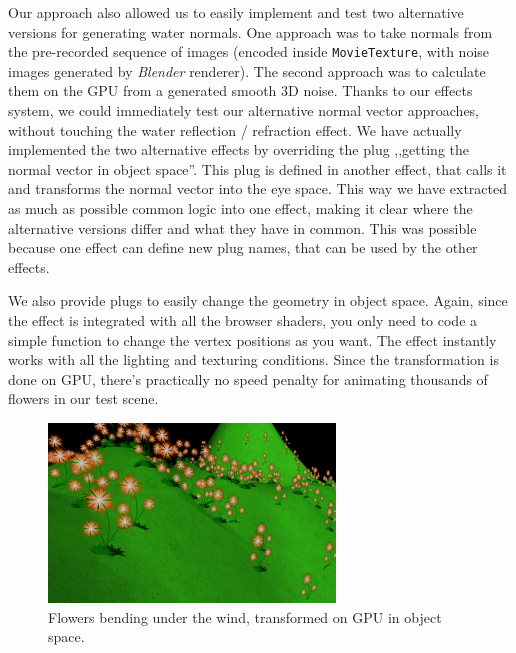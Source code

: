 \documentclass{acmsiggraph}                     %
\begin{document}
Our approach also allowed us to easily implement and test
two alternative versions for generating water normals.
One approach was to take normals from the pre-recorded sequence of images
(encoded inside \texttt{MovieTexture},
with noise images generated by \emph{Blender} renderer).
The second approach was to calculate them on the GPU from
a generated smooth 3D noise. Thanks to our effects system,
we could immediately test our alternative normal vector approaches,
without touching the water reflection / refraction effect.
We have actually implemented the two alternative effects by overriding
the plug ,,getting the normal vector in object space''.
This plug is defined in another effect, that calls it and transforms
the normal vector into the eye space. This way we have extracted
as much as possible common logic into one effect, making it clear
where the alternative versions differ and what they have in common.
This was possible because one effect can define
new plug names, that can be used by the other effects.


We also provide plugs to easily change the geometry in object space.
Again, since the effect is integrated with all the browser shaders,
you only need to code a simple function to change the vertex positions
as you want. The effect instantly works with all the lighting and texturing
conditions. Since the transformation is done on GPU, there's practically
no speed penalty for animating thousands of flowers in our test scene.

\begin{figure}[H]
  \centering
  \includegraphics[width=3in]{flowers}
  \caption{Flowers bending under the wind, transformed on GPU in object space.}
\end{figure}
\end{document}
